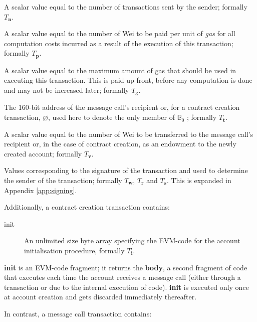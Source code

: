 \documentclass[9pt,oneside]{amsart}
\begin{document}
\begin{multicols}{2}
\begin{description}
\hypertarget{T n}{
\item[nonce] \label{itm:nonce} A scalar value equal to the number of transactions sent by the sender; formally $T_\mathbf{n}$.}\hypertarget{T p}{
\item[gasPrice] A scalar value equal to the number of Wei to be paid per unit of \textit{gas} for all computation costs incurred as a result of the execution of this transaction; formally $T_\mathbf{p}$.}\hypertarget{T g}{
\item[gasLimit] A scalar value equal to the maximum amount of gas that should be used in executing this transaction. This is paid up-front, before any computation is done and may not be increased later; formally $T_\mathbf{g}$.}\hypertarget{T t}{
\item[to] The 160-bit address of the message call's recipient or, for a contract creation transaction, $\varnothing$, used here to denote the only member of $\mathbb{B}_0$ ; formally $T_\mathbf{t}$.}\hypertarget{T v}{
\item[value] A scalar value equal to the number of Wei to be transferred to the message call's recipient or, in the case of contract creation, as an endowment to the newly created account; formally $T_\mathbf{v}$.}
\item[v, r, s] Values corresponding to the signature of the transaction and used to determine the sender of the transaction; formally \hyperlink{T w}{$T_\mathbf{w}$}, \hyperlink{T r}{$T_\mathbf{r}$} and \hyperlink{T s}{$T_\mathbf{s}$}. This is expanded in Appendix \ref{app:signing}.
\end{description}

Additionally, a contract creation transaction contains:

\begin{description}
\item[init] An unlimited size byte array specifying the EVM-code for the account initialisation procedure, formally $T_\mathbf{i}$.
\end{description}

\textbf{init} is an EVM-code fragment; it returns the \textbf{body}, a second fragment of code that executes each time the account receives a message call (either through a transaction or due to the internal execution of code). \textbf{init} is executed only once at account creation and gets discarded immediately thereafter.

In contrast, a message call transaction contains:


\end{multicols}
\end{document}
